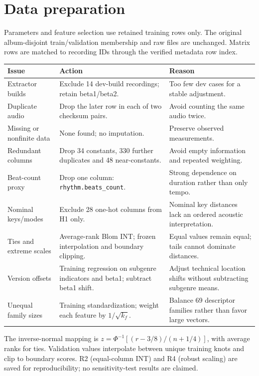 \documentclass[10pt,a4paper,twocolumn]{article}
\begin{document}
\section{Data preparation}
Parameters and feature selection use retained training rows only. The original album-disjoint train/validation membership and raw files are unchanged. Matrix rows are matched to recording IDs through the verified metadata row index.

{\small\begin{tabularx}{\linewidth}{@{}L{1.9cm} Y Y@{}}\toprule
Issue & Action & Reason\\\midrule
Extractor builds & Exclude 14 dev-build recordings; retain beta1/beta2. & Too few dev cases for a stable adjustment.\\
Duplicate audio & Drop the later row in each of two checksum pairs. & Avoid counting the same audio twice.\\
Missing or nonfinite data & None found; no imputation. & Preserve observed measurements.\\
Redundant columns & Drop 34 constants, 330 further duplicates and 48 near-constants. & Avoid empty information and repeated weighting.\\
Beat-count proxy & Drop one column: \texttt{rhythm.}\newline\texttt{beats\_count}. & Strong dependence on duration rather than only tempo.\\
Nominal keys/modes & Exclude 28 one-hot columns from H1 only. & Nominal key distances lack an ordered acoustic interpretation.\\
Ties and extreme scales & Average-rank Blom INT; frozen interpolation and boundary clipping. & Equal values remain equal; tails cannot dominate distances.\\
Version offsets & Training regression on subgenre indicators and beta1; subtract beta1 shift. & Adjust technical location shifts without subtracting subgenre means.\\
Unequal family sizes & Training standardization; weight each feature by $1/\sqrt{k_f}$. & Balance 69 descriptor families rather than favor large vectors.\\\bottomrule
\end{tabularx}}
The inverse-normal mapping is $z=\Phi^{-1}[(r-3/8)/(n+1/4)]$, with average ranks for ties. Validation values interpolate between unique training knots and clip to boundary scores. R2 (equal-column INT) and R4 (robust scaling) are saved for reproducibility; no sensitivity-test results are claimed.
\end{document}
